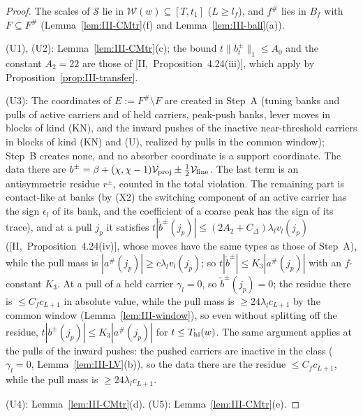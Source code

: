 \documentclass[10pt]{amsart}
\theoremstyle{definition}
\theoremstyle{remark}
\begin{document}
\begin{proof}
The scales of $\mathcal S$ lie in $\mathcal W(w)\subseteq[T,t_1]$ ($L\ge l_f$),
and $f^\#$ lies in $B_f$ with $F\subseteq F^\#$ (Lemma~\ref{lem:III-CMtr}(f) and
Lemma~\ref{lem:III-ball}(a)).

(U1), (U2): Lemma~\ref{lem:III-CMtr}(c); the bound $t\|b^\pm_t\|_1\le A_0$ and
the constant $A_2=22$ are those of [II,~Proposition~4.24(iii)], which apply by
Proposition~\ref{prop:III-transfer}.

(U3): The coordinates of $E:=F^\#\setminus F$ are created in Step~A (tuning
banks and pulls of active carriers and of held carriers, peak-push banks,
lever moves in blocks of kind (KN), and the inward pushes of the inactive
near-threshold carriers in blocks of kind (KN) and (U), realized by pulls in
the common window); Step~B creates none, and no absorber
coordinate is a support coordinate.  The data there are
$b^\pm=\beta+(\chi,\chi-1)\mathcal V_{\rm proj}\pm\frac12\mathcal V_{\rm fine}$.  The
last term is an antisymmetric residue $r^\pm$, counted in the total violation.
The remaining part is contact-like at banks (by (X2) the switching component
of an active carrier has the sign $\epsilon_l$ of its bank, and the
coefficient of a coarse peak has the sign of its trace), and at a pull $j_p$
it satisfies $t|\tilde b^\pm(j_p)|\le(2A_2+C_\Delta)\lambda_lv_l(j_p)$
([II,~Proposition~4.24(iv)], whose moves have the same types as those of
Step~A), while the pull mass is $|a^\#(j_p)|\ge c\lambda_lv_l(j_p)$; so
$t|\tilde b^\pm|\le K_3|a^\#(j_p)|$ with an $f$-constant $K_3$.  At a pull of a held
carrier $\gamma_l=0$, so $\tilde b^\pm(j_p)=0$; the residue there is
$\le C_fc_{L+1}$ in absolute value, while the pull mass is
$\ge24\lambda_lc_{L+1}$ by the common window (Lemma~\ref{lem:III-window}), so
even without splitting off the residue, $t|b^\pm(j_p)|\le K_3|a^\#(j_p)|$ for
$t\le T_{\rm hi}(w)$.  The same argument applies at the pulls of the inward
pushes: the pushed carriers are inactive in the class ($\gamma_l=0$,
Lemma~\ref{lem:III-LV}(b)), so the data there are the residue $\le C_fc_{L+1}$,
while the pull mass is $\ge24\lambda_lc_{L+1}$.

(U4): Lemma~\ref{lem:III-CMtr}(d).  (U5): Lemma~\ref{lem:III-CMtr}(e).


\end{proof}
\end{document}
